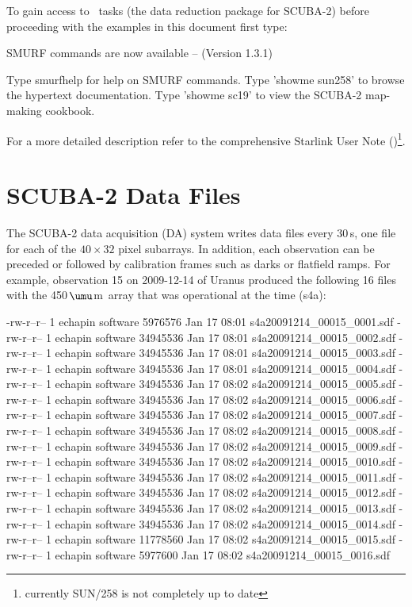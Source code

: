 \documentclass[twoside,11pt]{starlink}
\providecommand{\micron}{\mbox{\,${\umu}$m}}            %
\providecommand{\smurf}{\xref{\textsc{Smurf}}{sun258}{}}
\providecommand{\smurfsun}{\xref{\textbf{SUN/258}}{sun258}{}}
\begin{document}
To gain access to \smurf\ tasks (the data reduction package for
SCUBA-2) before proceeding with the examples in this document first
type:

\begin{terminalv}


        SMURF commands are now available -- (Version 1.3.1)

        Type smurfhelp for help on SMURF commands.
        Type 'showme sun258' to browse the hypertext documentation.
        Type 'showme sc19' to view the SCUBA-2 map-making cookbook.


\end{terminalv}
%

For a more detailed description refer to the comprehensive Starlink
User Note (\smurfsun)\footnote{currently SUN/258 is not completely up
  to date}.


\section{SCUBA-2 Data Files}
\label{sec:data}

The SCUBA-2 data acquisition (DA) system writes data files every
30\,s, one file for each of the $40\times32$ pixel subarrays. In
addition, each observation can be preceded or followed by calibration
frames such as darks or flatfield ramps. For example, observation 15
on 2009-12-14 of Uranus produced the following 16 files with the
450\micron\ array that was operational at the time (s4a):

\begin{small}
\begin{terminalv}
-rw-r--r-- 1 echapin software  5976576 Jan 17 08:01 s4a20091214_00015_0001.sdf
-rw-r--r-- 1 echapin software 34945536 Jan 17 08:01 s4a20091214_00015_0002.sdf
-rw-r--r-- 1 echapin software 34945536 Jan 17 08:01 s4a20091214_00015_0003.sdf
-rw-r--r-- 1 echapin software 34945536 Jan 17 08:01 s4a20091214_00015_0004.sdf
-rw-r--r-- 1 echapin software 34945536 Jan 17 08:02 s4a20091214_00015_0005.sdf
-rw-r--r-- 1 echapin software 34945536 Jan 17 08:02 s4a20091214_00015_0006.sdf
-rw-r--r-- 1 echapin software 34945536 Jan 17 08:02 s4a20091214_00015_0007.sdf
-rw-r--r-- 1 echapin software 34945536 Jan 17 08:02 s4a20091214_00015_0008.sdf
-rw-r--r-- 1 echapin software 34945536 Jan 17 08:02 s4a20091214_00015_0009.sdf
-rw-r--r-- 1 echapin software 34945536 Jan 17 08:02 s4a20091214_00015_0010.sdf
-rw-r--r-- 1 echapin software 34945536 Jan 17 08:02 s4a20091214_00015_0011.sdf
-rw-r--r-- 1 echapin software 34945536 Jan 17 08:02 s4a20091214_00015_0012.sdf
-rw-r--r-- 1 echapin software 34945536 Jan 17 08:02 s4a20091214_00015_0013.sdf
-rw-r--r-- 1 echapin software 34945536 Jan 17 08:02 s4a20091214_00015_0014.sdf
-rw-r--r-- 1 echapin software 11778560 Jan 17 08:02 s4a20091214_00015_0015.sdf
-rw-r--r-- 1 echapin software  5977600 Jan 17 08:02 s4a20091214_00015_0016.sdf
\end{terminalv}
\end{small}
\end{document}
